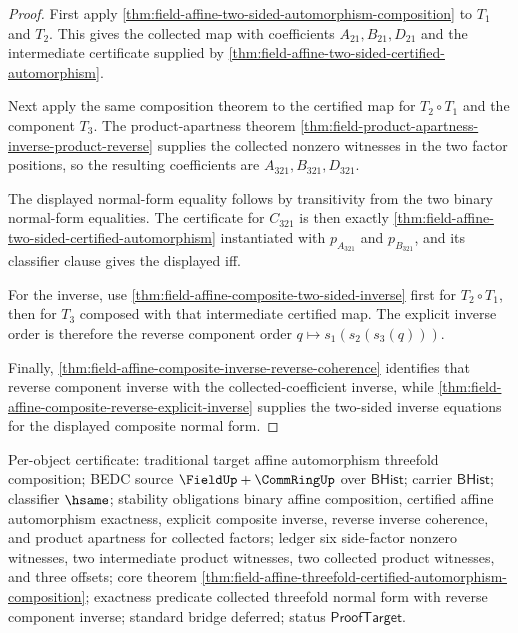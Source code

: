 \begin{proof}
First apply
\autoref{thm:field-affine-two-sided-automorphism-composition} to $T_1$ and
$T_2$. This gives the collected map with coefficients
$A_{21},B_{21},D_{21}$ and the intermediate certificate supplied by
\autoref{thm:field-affine-two-sided-certified-automorphism}.

Next apply the same composition theorem to the certified map for
$T_2\circ T_1$ and the component $T_3$. The product-apartness theorem
\autoref{thm:field-product-apartness-inverse-product-reverse} supplies the
collected nonzero witnesses in the two factor positions, so the resulting
coefficients are $A_{321},B_{321},D_{321}$.

The displayed normal-form equality follows by transitivity from the two binary
normal-form equalities. The certificate for $C_{321}$ is then exactly
\autoref{thm:field-affine-two-sided-certified-automorphism} instantiated with
$p_{A_{321}}$ and $p_{B_{321}}$, and its classifier clause gives the displayed
iff.

For the inverse, use
\autoref{thm:field-affine-composite-two-sided-inverse} first for
$T_2\circ T_1$, then for $T_3$ composed with that intermediate certified map.
The explicit inverse order is therefore the reverse component order
$q\mapsto s_1(s_2(s_3(q)))$.

Finally,
\autoref{thm:field-affine-composite-inverse-reverse-coherence} identifies that
reverse component inverse with the collected-coefficient inverse, while
\autoref{thm:field-affine-composite-reverse-explicit-inverse} supplies the
two-sided inverse equations for the displayed composite normal form.
\end{proof}

Per-object certificate: traditional target affine automorphism threefold
composition; BEDC source $\FieldUp+\CommRingUp$ over $\mathsf{BHist}$; carrier
$\mathsf{BHist}$; classifier $\hsame$; stability obligations binary affine
composition, certified affine automorphism exactness, explicit composite
inverse, reverse inverse coherence, and product apartness for collected
factors; ledger six side-factor nonzero witnesses, two intermediate product
witnesses, two collected product witnesses, and three offsets; core theorem
\autoref{thm:field-affine-threefold-certified-automorphism-composition};
exactness predicate collected threefold normal form with reverse component
inverse; standard bridge deferred; status $\mathsf{ProofTarget}$.
